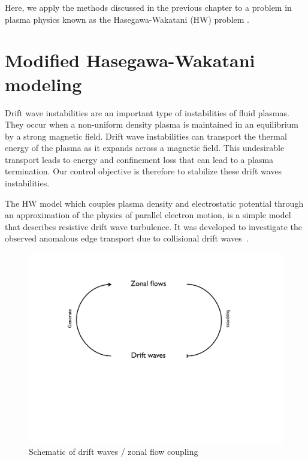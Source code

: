 \documentclass[12pt,lot, lof]{puthesis}
\begin{document}
Here, we apply the methods discussed in the previous chapter to a problem in plasma physics known as
the Hasegawa-Wakatani (HW) problem \cite{Hasegawa1,Hasegawa2}.
\section{Modified Hasegawa-Wakatani modeling}

Drift wave instabilities are an important type of instabilities of fluid plasmas. They occur when a non-uniform density plasma is maintained in an equilibrium by a strong magnetic field. Drift wave instabilities can transport the thermal energy of the plasma as it expands across a magnetic field. This undesirable transport leads to energy and confinement loss that can lead to a plasma termination. Our control objective is therefore to stabilize these drift waves instabilities.

The HW model which couples plasma density and electrostatic potential through an approximation of the physics of parallel electron motion, is a simple model that describes resistive drift wave turbulence. It was developed to investigate the observed anomalous edge transport due to collisional drift waves~\cite{Horton}.

\begin{figure}[htbp]
\centering
\includegraphics [width=0.7\linewidth]{rel} 
\caption{Schematic of drift waves / zonal flow coupling}
\label{rel}
\end{figure}
\end{document}
